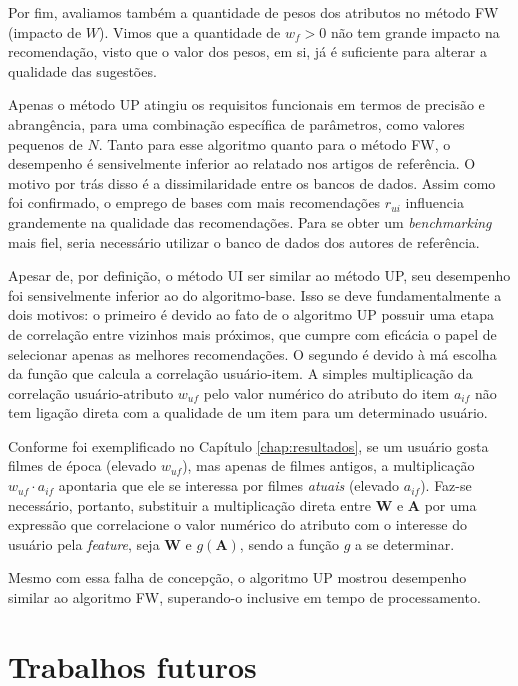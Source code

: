 Por fim, avaliamos também a quantidade de pesos dos atributos no método FW (impacto de $W$). Vimos que a quantidade de $w_f>0$ não tem grande impacto na recomendação, visto que o valor dos pesos, em si, já é suficiente para alterar a qualidade das sugestões.

Apenas o método UP atingiu os requisitos funcionais em termos de precisão e abrangência, para uma combinação específica de parâmetros, como valores pequenos de $N$. Tanto para esse algoritmo quanto para o método FW, o desempenho é sensivelmente inferior ao relatado nos artigos de referência. O motivo por trás disso é a dissimilaridade entre os bancos de dados. Assim como foi confirmado, o emprego de bases com mais recomendações $r_{ui}$ influencia grandemente na qualidade das recomendações. Para se obter um \textit{benchmarking} mais fiel, seria necessário utilizar o banco de dados dos autores de referência. 

Apesar de, por definição, o método UI ser similar ao método UP, seu desempenho foi sensivelmente inferior ao do algoritmo-base. Isso se deve fundamentalmente a dois motivos: o primeiro é devido ao fato de o algoritmo UP possuir uma etapa de correlação entre vizinhos mais próximos, que cumpre com eficácia o papel de selecionar apenas as melhores recomendações. O segundo é devido à má escolha da função que calcula a correlação usuário-item. A simples multiplicação da correlação usuário-atributo $w_{uf}$ pelo valor numérico do atributo do item $a_{if}$ não tem ligação direta com a qualidade de um item para um determinado usuário. 

Conforme foi exemplificado no Capítulo \ref{chap:resultados}, se um usuário gosta filmes de época (elevado $w_{uf}$), mas apenas de filmes antigos, a multiplicação $w_{uf} \cdot a_{if} $ apontaria que ele se interessa por filmes \textit{atuais} (elevado $a_{if}$). Faz-se necessário, portanto, substituir a multiplicação direta entre $\mathbf{W}$ e $\mathbf{A}$ por uma expressão que correlacione o valor numérico do atributo com o interesse do usuário pela \textit{feature}, seja $\mathbf{W}$ e $g\left(\mathbf{A}\right)$, sendo a função $g$ a se determinar. 

Mesmo com essa falha de concepção, o algoritmo UP mostrou desempenho similar ao algoritmo FW, superando-o inclusive em tempo de processamento. 

\section{Trabalhos futuros} %
\label{sec:trabalhos_futuros}

